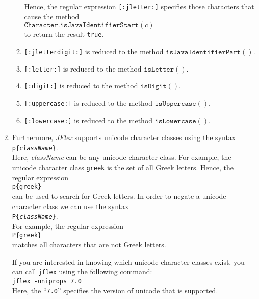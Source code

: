 \begin{enumerate}
\begin{enumerate}
            Hence, the regular expression \texttt{[:jletter:]} specifies those characters that cause
            the method 
            \\[0.2cm]
            \hspace*{1.3cm}
            $\mathtt{Character}.\texttt{isJavaIdentifierStart}(c)$
            \\[0.2cm]
            to return the result \texttt{true}.
      \item \texttt{[:jletterdigit:]} is reduced to the method
            $\texttt{isJavaIdentifierPart}()$.
      \item \texttt{[:letter:]} is reduced to the method
            $\texttt{isLetter}()$.
      \item \texttt{[:digit:]} is reduced to the method
            $\texttt{isDigit}()$.
      \item \texttt{[:uppercase:]} is reduced to the method
            $\texttt{isUppercase}()$.
      \item \texttt{[:lowercase:]} is reduced to the method
            $\texttt{isLowercase}()$.
      \end{enumerate}
\item Furthermore,  \textsl{JFlex} supports  unicode character classes using the syntax 
      \\[0.2cm]
      \hspace*{1.3cm}
      \texttt{p\{\textsl{className}\}}.
      \\[0.2cm]
      Here, \textsl{className} can be any unicode character class.  For example, 
      the unicode character class \texttt{greek} is the set of all Greek letters.  Hence, the
      regular expression
      \\[0.2cm]
      \hspace*{1.3cm}
      \texttt{p\{greek\}}
      \\[0.2cm]
      can be used to search for Greek letters.  In order to negate a  unicode character class we can
      use the syntax
      \\[0.2cm]
      \hspace*{1.3cm}
      \texttt{P\{\textsl{className}\}}.
      \\[0.2cm]
      For example, the regular expression
      \\[0.2cm]
      \hspace*{1.3cm}
      \texttt{P\{greek\}}
      \\[0.2cm]
      matches all characters that are not Greek letters.
      
      If you are interested in knowing which unicode character classes exist, you can call 
      \texttt{jflex} using the following command:
      \\[0.2cm]
      \hspace*{1.3cm}
      \texttt{jflex -uniprops 7.0}
      \\[0.2cm]
      Here, the ``\texttt{7.0}'' specifies the version of  unicode that is supported.
 \end{enumerate}

